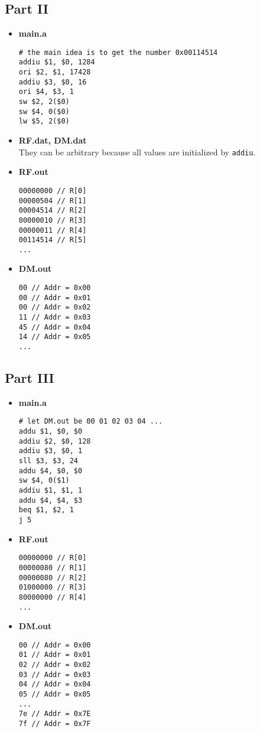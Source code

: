 \documentclass[12pt]{article}
\begin{document}
\subsection*{Part II}
\begin{itemize}
\item 
\textbf{main.a}
\begin{lstlisting}[language={}, frame=single]
# the main idea is to get the number 0x00114514
addiu $1, $0, 1284
ori $2, $1, 17428
addiu $3, $0, 16
ori $4, $3, 1
sw $2, 2($0)
sw $4, 0($0)
lw $5, 2($0)
\end{lstlisting}

\item \textbf{RF.dat, DM.dat} \\
They can be arbitrary because all values are initialized by \texttt{addiu}.

\item
\textbf{RF.out}
\begin{lstlisting}[language={}]
00000000 // R[0]
00000504 // R[1]
00004514 // R[2]
00000010 // R[3]
00000011 // R[4]
00114514 // R[5]
...
\end{lstlisting}

\item
\textbf{DM.out}
\begin{lstlisting}[language={}]
00 // Addr = 0x00
00 // Addr = 0x01
00 // Addr = 0x02
11 // Addr = 0x03
45 // Addr = 0x04
14 // Addr = 0x05
...
\end{lstlisting}
\end{itemize}

\subsection*{Part III}

\begin{itemize}
\item 
\textbf{main.a}
\begin{lstlisting}[language={}, frame=single]
# let DM.out be 00 01 02 03 04 ...
addu $1, $0, $0
addiu $2, $0, 128
addiu $3, $0, 1
sll $3, $3, 24
addu $4, $0, $0
sw $4, 0($1)
addiu $1, $1, 1
addu $4, $4, $3
beq $1, $2, 1
j 5
\end{lstlisting}

\item 
\textbf{RF.out}
\begin{lstlisting}[language={}]
00000000 // R[0]
00000080 // R[1]
00000080 // R[2]
01000000 // R[3]
80000000 // R[4]
...
\end{lstlisting}

\item 
\textbf{DM.out}
\begin{lstlisting}[language={}]
00 // Addr = 0x00
01 // Addr = 0x01
02 // Addr = 0x02
03 // Addr = 0x03
04 // Addr = 0x04
05 // Addr = 0x05
...
7e // Addr = 0x7E
7f // Addr = 0x7F
\end{lstlisting}
\end{itemize}
\end{document}
